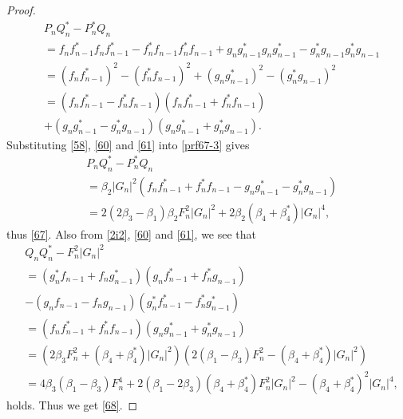 \documentclass[10pt,leqno]{amsart}
\numberwithin{equation}{section}
\begin{document}
\begin{proof}
\begin{equation}
\begin{split}
&P_{n}Q_{n}^{*}-P_{n}^{*}Q_{n}\\
&=f_{n}f_{n-1}^*f_{n}f_{n-1}^*-f_{n}^*f_{n-1}f_{n}^*f_{n-1}+g_{n}g_{n-1}^*g_{n}g_{n-1}^*-g_{n}^*g_{n-1}g_{n}^*g_{n-1}\\
&=\left(f_{n}f_{n-1}^*\right)^{2}-\left(f_{n}^{*}f_{n-1}\right)^{2}+\left(g_{n}g_{n-1}^*\right)^{2}-\left(g_{n}^{*}g_{n-1}\right)^{2}\\
&=\left(f_{n}f_{n-1}^{*}-f_{n}^*f_{n-1}\right)\left(f_{n}f_{n-1}^{*}+f_{n}^*f_{n-1}\right)\\
&+\left(g_{n}g_{n-1}^{*}-g_{n}^{*}g_{n-1}\right)\left(g_{n}g_{n-1}^{*}+g_{n}^{*}g_{n-1}\right).
\end{split}
\end{equation}
Substituting \eqref{58}, \eqref{60} and \eqref{61} into \eqref{prf67-3} gives
\begin{equation}\label{prf67-4}
\begin{split}
&P_{n}Q_{n}^{*}-P_{n}^{*}Q_{n}\\
&=\beta_{2} |G_{n}|^{2}\left(f_{n}f_{n-1}^{*}+f_{n}^{*}f_{n-1}-g_{n}g_{n-1}^{*}-g_{n}^{*}g_{n-1}\right)\\
&=2\left(2\beta_{3}-\beta_{1}\right)\beta_{2} F_{n}^{2}|G_{n}|^{2}+2\beta_{2}\left(\beta_{4}+\beta_{4}^{*}\right)|G_{n}|^{4},
\end{split}
\end{equation}
thus \eqref{67}.
Also from \eqref{2i2}, \eqref{60} and \eqref{61}, we see that
\begin{equation}\label{prf68}
\begin{split}
&Q_{n}Q_{n}^{*}-F_{n}^{2}|G_{n}|^{2}\\
&=\left(g_{n}^{*}f_{n-1}+f_{n}g_{n-1}^{*}\right)\left(g_{n}f_{n-1}^{*}+f_{n}^{*}g_{n-1}\right)\\
&-\left(g_{n}f_{n-1}-f_{n}g_{n-1}\right)\left(g_{n}^{*}f_{n-1}^{*}-f_{n}^{*}g_{n-1}^{*}\right)\\
&=\left(f_{n}f_{n-1}^{*}+f_{n}^*f_{n-1}\right)\left(g_{n}g_{n-1}^{*}+g_{n}^{*}g_{n-1}\right)\\
&=\left(2\beta_{3} F_{n}^{2}+\left(\beta_{4}+\beta_{4}^{*}\right)|G_{n}|^{2}\right)\left(2\left(\beta_{1}-\beta_{3}\right)F_{n}^{2}-\left(\beta_{4}+\beta_{4}^{*}\right)|G_{n}|^{2}\right)\\
&=4\beta_{3}\left(\beta_{1}-\beta_{3}\right)F_{n}^{4}+2\left(\beta_{1}-2\beta_{3}\right)\left(\beta_{4}+\beta_{4}^{*}\right)F_{n}^{2}|G_{n}|^{2}-\left(\beta_{4}+\beta_{4}^{*}\right)^{2}|G_{n}|^{4},
\end{split}
\end{equation}
holds. Thus we get \eqref{68}. 
\end{proof}
\end{document}
